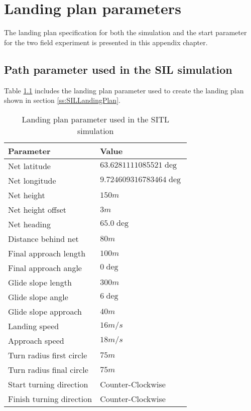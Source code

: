 \chapter{Landing plan parameters}
The landing plan specification for both the simulation and the start parameter for the two field experiment is presented in this appendix chapter.
\section{Path parameter used in the SIL simulation}\label{AP:SpecSIL}
Table \ref{AP:TB:landingSITL} includes the landing plan parameter used to create the landing plan shown in section \ref{ss:SILLandingPlan}.
\newpage
\begin{table}[H]
\centering
\begin{tabular}{| p{4cm} | p{4cm} |}
\hline
\textbf{Parameter}			& \textbf{Value}			\\ \hline
Net latitude				& $63.6281111085521 \deg$ 	\\ \hline
Net longitude				& $9.724609316783464 \deg$ 	\\ \hline
Net height					& $150 m$					\\ \hline
Net height offset			& $3 m$ 	\\ \hline
Net heading					& $65.0 \deg$				\\ \hline
Distance behind net			& $80 m$					\\ \hline
Final approach length		& $100 m$					\\ \hline
Final approach angle		& $0 \deg$					\\ \hline
Glide slope length			& $300 m $					\\ \hline
Glide slope angle			& $6 \deg$					\\ \hline
Glide slope approach		& $40 m$					\\ \hline
Landing speed				& $16 m/s$					\\ \hline
Approach speed				& $18 m/s$					\\ \hline
Turn radius first circle	& $75 m$					\\ \hline
Turn radius final circle	& $75 m$					\\ \hline
Start turning direction		& Counter-Clockwise			\\ \hline
Finish turning direction	& Counter-Clockwise			\\ \hline
\end{tabular}
\caption{Landing plan parameter used in the SITL simulation}
\label{AP:TB:landingSITL}
\end{table}

